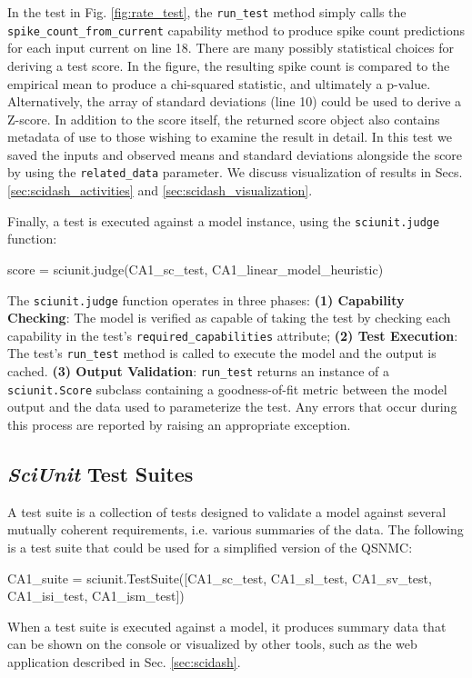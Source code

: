 \documentclass[11pt,letterpaper]{article}
\let\verbx\lstinline
\begin{document}
In the test in Fig. \ref{fig:rate_test}, the \verbx{run_test} method simply calls the \verbx{spike_count_from_current} capability method to produce spike count predictions for each input current on line 18. 
There are many possibly statistical choices for deriving a test score.  
In the figure, the resulting spike count is compared to the empirical mean to produce a chi-squared statistic, and ultimately a p-value. 
Alternatively, the array of standard deviations (line 10) could be used to derive a Z-score.  
In addition to the score itself, the returned score object also contains metadata of use to those wishing to examine the result in detail. 
In this test we saved the inputs and observed means and standard deviations alongside the score by using the \verbx{related_data} parameter. 
We discuss visualization of results in Secs. \ref{sec:scidash_activities} and \ref{sec:scidash_visualization}.

Finally, a test is executed against a model instance, using the \verbx{sciunit.judge} function:
\begin{python}
score = sciunit.judge(CA1_sc_test, CA1_linear_model_heuristic)
\end{python}

The \verbx{sciunit.judge} function operates in three phases: 
\textbf{(1) Capability Checking}: The model is verified as capable of taking the test by checking each capability in the test's \verbx{required_capabilities} attribute; 
\textbf{(2) Test Execution}: The test's \verbx{run_test} method is called to execute the model and the output is cached. 
\textbf{(3) Output Validation}: \verbx{run_test} returns an instance of a \verbx{sciunit.Score} subclass containing a goodness-of-fit metric between the model output and the data used to parameterize the test.  
Any errors that occur during this process are reported by raising an appropriate exception.

\subsection{\textit{SciUnit} Test Suites}
A test suite is a collection of tests designed to validate a model against several mutually coherent requirements, i.e. various summaries of the data.  
The following is a test suite that could be used for a simplified version of the QSNMC:  
\begin{python}
CA1_suite = sciunit.TestSuite([CA1_sc_test, CA1_sl_test, CA1_sv_test, CA1_isi_test, CA1_ism_test])
\end{python}
When a test suite is executed against a model, it produces summary data that can be shown on the console or visualized by other tools, such as the web application described in Sec. \ref{sec:scidash}.
\end{document}
